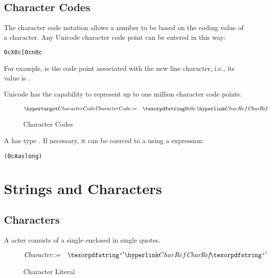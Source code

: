 \subsection{Character Codes}
The character code notation allows a number to be based on the coding value of a character. Any Unicode character code point can be entered in this way:
\begin{alltt}
0cX 0c[ 0c\bsl{}n 0c
\end{alltt}
For example,  is the code point associated with the new line character, i.e., its value is .
\begin{aside}
Unicode has the capability to represent up to one million character code points.
\end{aside}

\begin{figure}[htbp]
\label{characterCodeFig}
\begin{eqnarray*}
\ntDef{CharacterCode}&\arrow&\q{0c}\,\ntRef{CharRef}
\end{eqnarray*}
\caption{Character Codes}
\vspace{-2ex}
\end{figure}

A  has type . If necessary, it can be coerced to a  using a  expression:
\begin{alltt}
(0cA as long)
\end{alltt}

\section{Strings and Characters}
\label{string}

\subsection{Characters}
\label{character}
A acter consists of a single  enclosed in single quotes.

\begin{figure}[htbp]
\begin{eqnarray*}
\emph{Character}&\arrow&\q{'}\ntRef{CharRef}\q{'}\\
\end{eqnarray*}
\caption{Character Literal}
\label{characterFig}
\end{figure}

